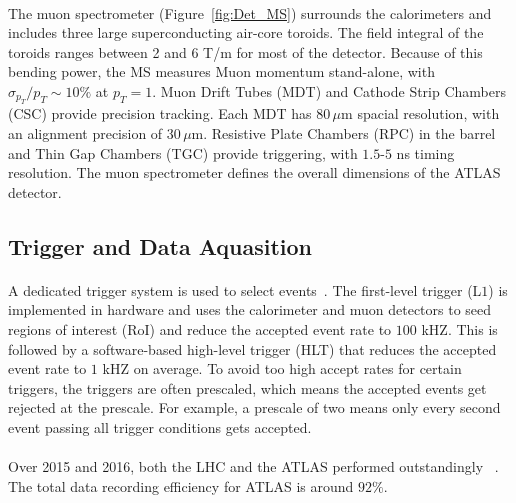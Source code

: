 \paragraph{}
The muon spectrometer (Figure~\ref{fig:Det_MS}) surrounds the calorimeters and includes three large superconducting air-core toroids. 
The field integral of the toroids ranges between 2 and 6 T/m for most of the detector. Because of this bending power, the MS measures Muon momentum stand-alone, with $\sigma_{p_{T}}/p_{T} \sim 10\%$ at $p_{T} = 1$\TeV. 
Muon Drift Tubes (MDT) and Cathode Strip Chambers (CSC) provide precision tracking. 
Each MDT has $80\,\mu\textrm{m}$ spacial resolution, with an alignment precision of $30\,\mu\textrm{m}$.
Resistive Plate Chambers (RPC) in the barrel and Thin Gap Chambers (TGC) provide triggering, with $1.5$-$5$ ns timing resolution.  The muon spectrometer defines the overall dimensions of the ATLAS
detector.

\subsection{Trigger and Data Aquasition}
\paragraph{}
A dedicated trigger system is used to select events~\cite{ATLAS-TRIGGER}.
The first-level trigger (L$1$) is implemented in hardware and uses the calorimeter and muon detectors to seed regions of interest (RoI) and reduce the accepted event rate to $100$ kHZ.
This is followed by a software-based high-level trigger (HLT) that reduces the accepted event rate to $1$ kHZ on average. 
To avoid too high accept rates for certain triggers, the triggers are often prescaled, which means the accepted events get rejected at the prescale. For example, a prescale of two means only every second event passing all trigger conditions gets accepted. 

\paragraph{}
Over 2015 and 2016, both the LHC and the ATLAS performed outstandingly ~\cite{Lumi_Run2}. The total data recording efficiency for ATLAS is around $92\%$.

